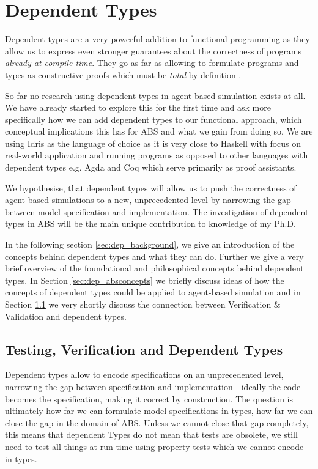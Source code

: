 \chapter{Dependent Types}
\label{chap:dependent_types}
Dependent types are a very powerful addition to functional programming as they allow us to express even stronger guarantees about the correctness of programs \textit{already at compile-time}. They go as far as allowing to formulate programs and types as constructive proofs which must be \textit{total} by definition \cite{thompson_type_1991, mckinna_why_2006, altenkirch_pi_2010}. 

So far no research using dependent types in agent-based simulation exists at all. We have already started to explore this for the first time and ask more specifically how we can add dependent types to our functional approach, which conceptual implications this has for ABS and what we gain from doing so. We are using Idris \cite{brady_idris_2013} as the language of choice as it is very close to Haskell with focus on real-world application and running programs as opposed to other languages with dependent types e.g. Agda and Coq which serve primarily as proof assistants.

We hypothesise, that  dependent types will allow us to push the correctness of agent-based simulations to a new, unprecedented level by narrowing the gap between model specification and implementation. The investigation of dependent types in ABS will be the main unique contribution to knowledge of my Ph.D.

In the following section \ref{sec:dep_background}, we give an introduction of the concepts behind dependent types and what they can do. Further we give a very brief overview of the foundational and philosophical concepts behind dependent types. In Section \ref{sec:dep_absconcepts} we briefly discuss ideas of how the concepts of dependent types could be applied to agent-based simulation and in Section \ref{sec:dep_vav_deptypes} we very shortly discuss the connection between Verification \& Validation and dependent types.





\section{Testing, Verification and Dependent Types}
\label{sec:dep_vav_deptypes}
Dependent types allow to encode specifications on an unprecedented level, narrowing the gap between specification and implementation - ideally the code becomes the specification, making it correct by construction. The question is ultimately how far we can formulate model specifications in types, how far we can close the gap in the domain of ABS. Unless we cannot close that gap completely, this means that dependent Types do not mean that tests are obsolete, we still need to test all things at run-time using property-tests which we cannot encode in types.


